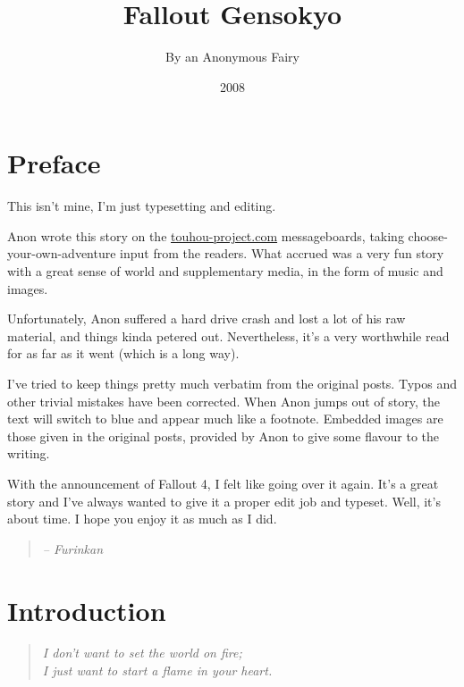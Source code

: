 \documentclass[a4paper,12pt]{article}
\begin{document}
\title{Fallout Gensokyo}
\author{By an Anonymous Fairy}
\date{2008}
\maketitle


\section{Preface}

This isn't mine, I'm just typesetting and editing.

Anon wrote this story on the \url{touhou-project.com} messageboards, taking
choose-your-own-adventure input from the readers. What accrued was a very fun
story with a great sense of world and supplementary media, in the form of music
and images.

Unfortunately, Anon suffered a hard drive crash and lost a lot of his raw
material, and things kinda petered out. Nevertheless, it's a very worthwhile
read for as far as it went (which is a long way).

I've tried to keep things pretty much verbatim from the original posts. Typos
and other trivial mistakes have been corrected. When Anon jumps out of story,
the text will switch to {\color{MidnightBlue} blue} and appear much like a
footnote. Embedded images are those given in the original posts, provided by
Anon to give some flavour to the writing.

With the announcement of Fallout 4, I felt like going over it again.  It's a
great story and I've always wanted to give it a proper edit job and typeset.
Well, it's about time. I hope you enjoy it as much as I did.

\begin{quote}
\emph{-- Furinkan}
\end{quote}



\section{Introduction}


\begin{quote}
\emph{I don't want to set the world on fire;\\
I just want to start a flame in your heart.}
\end{quote}
\end{document}
